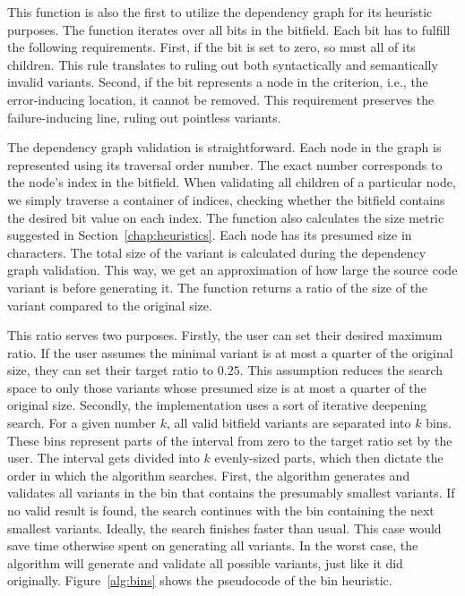 This function is also the first to utilize the dependency graph for its 
heuristic purposes. 
The function iterates over all bits in the bitfield. 
Each bit has to fulfill the following requirements. 
First, if the bit is set to zero, so must all of its children. 
This rule translates to ruling out both syntactically and semantically 
invalid variants. 
Second, if the bit represents a node in the criterion, i.e., 
the error-inducing location, it cannot be removed. 
This requirement preserves the failure-inducing line, ruling out pointless 
variants. 

The dependency graph validation is straightforward. 
Each node in the graph is represented using its traversal order number.
The exact number corresponds to the node's index in the bitfield. 
When validating all children of a particular node, we simply traverse 
a container of indices, checking whether the bitfield contains the desired 
bit value on each index.
The  function also calculates the size metric suggested in 
Section~\ref{chap:heuristics}. 
Each node has its presumed size in characters. 
The total size of the variant is calculated during the dependency graph 
validation. 
This way, we get an approximation of how large the source code variant is 
before generating it. 
The function returns a ratio of the size of the variant compared to 
the original size. 

This ratio serves two purposes. 
Firstly, the user can set their desired maximum ratio. 
If the user assumes the minimal variant is at most a quarter of 
the original size, they can set their target ratio to $0.25$. 
This assumption reduces the search space to only those variants whose 
presumed size is at most a quarter of the original size. 
Secondly, the implementation uses a sort of iterative deepening search. 
For a given number $k$, all valid bitfield variants are separated into $k$ 
bins. 
These bins represent parts of the interval from zero to the target ratio 
set by the user. 
The interval gets divided into $k$ evenly-sized parts, which then dictate 
the order in which the algorithm searches. 
First, the algorithm generates and validates all variants in the bin that 
contains the presumably smallest variants. 
If no valid result is found, the search continues with the bin containing 
the next smallest variants. 
Ideally, the search finishes faster than usual. 
This case would save time otherwise spent on generating all variants. 
In the worst case, the algorithm will generate and validate all possible 
variants, just like it did originally. 
Figure~\ref{alg:bins} shows the pseudocode of the bin heuristic.

